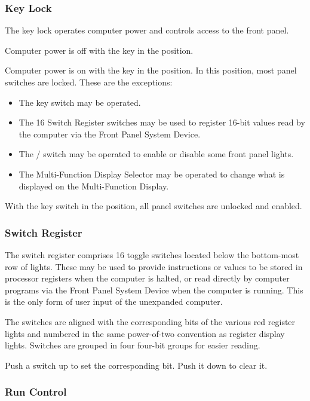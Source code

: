 \subsubsection{Key Lock}

The key lock operates computer power and controls access to the front
panel.

Computer power is off with the key in the  position.

Computer power is on with the key in the  position. In this position,
most panel switches are locked. These are the exceptions:

\begin{itemize}
\item The key switch may be operated.
\item The 16 Switch Register switches may be used to register 16-bit values
  read by the computer via the Front Panel System Device.
\item The / switch may be operated to enable or disable
  some front panel lights.
\item The Multi-Function Display Selector may be operated to change what is
  displayed on the Multi-Function Display.
\end{itemize}

With the key switch in the  position, all panel switches are unlocked
and enabled.

\subsubsection{Switch Register}

The switch register comprises 16 toggle switches located below the bottom-most
row of lights. These may be used to provide instructions or values to be stored
in processor registers when the computer is halted, or read directly by
computer programs via the Front Panel System Device when the computer is
running. This is the only form of user input of the unexpanded computer.

The switches are aligned with the corresponding bits of the various red
register lights and numbered in the same power-of-two convention as register
display lights. Switches are grouped in four four-bit groups for easier
reading.

Push a switch up to set the corresponding bit. Push it down to clear it.

\subsubsection{Run Control}

